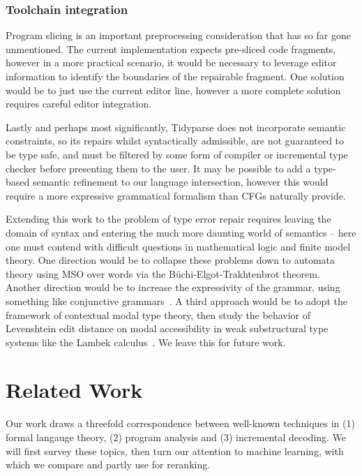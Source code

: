 \documentclass[sigplan,review,acmsmall,nonacm,screen,anonymous]{acmart}\settopmatter{printfolios=false,printccs=false,printacmref=false}
\begin{document}
\subsubsection{Toolchain integration}

Program slicing is an important preprocessing consideration that has so far gone unmentioned. The current implementation expects pre-sliced code fragments, however in a more practical scenario, it would be necessary to leverage editor information to identify the boundaries of the repairable fragment. One solution would be to just use the current editor line, however a more complete solution requires careful editor integration.

Lastly and perhaps most significantly, Tidyparse does not incorporate semantic constraints, so its repairs whilst syntactically admissible, are not guaranteed to be type safe, and must be filtered by some form of compiler or incremental type checker before presenting them to the user. It may be possible to add a type-based semantic refinement to our language intersection, however this would require a more expressive grammatical formalism than CFGs naturally provide.

Extending this work to the problem of type error repair requires leaving the domain of syntax and entering the much more daunting world of semantics -- here one must contend with difficult questions in mathematical logic and finite model theory. One direction would be to collapse these problems down to automata theory using MSO over words via the B\"uchi-Elgot-Trakhtenbrot theorem. Another direction would be to increase the expressivity of the grammar, using something like conjunctive grammars~\cite{okhotin2001conjunctive}. A third approach would be to adopt the framework of contextual modal type theory, then study the behavior of Levenshtein edit distance on modal accessibility in weak substructural type systems like the Lambek calculus~\cite{pshenitsyn2025first}. We leave this for future work.

\clearpage\section{Related Work}\label{sec:related}

Our work draws a threefold correspondence between well-known techniques in (1) formal langauge theory, (2) program analysis and (3) incremental decoding. We will first survey these topics, then turn our attention to machine learning, with which we compare and partly use for reranking.
\end{document}
